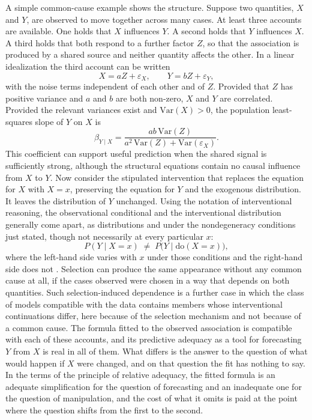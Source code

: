 \documentclass[11pt,letterpaper]{article}
\theoremstyle{definition}
\newcommand{\doop}{\mathrm{do}}
\begin{document}
A simple common-cause example shows the structure. Suppose two quantities, $X$ and $Y$, are observed to move together across many cases. At least three accounts are available. One holds that $X$ influences $Y$. A second holds that $Y$ influences $X$. A third holds that both respond to a further factor $Z$, so that the association is produced by a shared source and neither quantity affects the other. In a linear idealization the third account can be written
\begin{equation}
  X = aZ + \varepsilon_X,
  \qquad
  Y = bZ + \varepsilon_Y,
  \label{eq:common}
\end{equation}
with the noise terms independent of each other and of $Z$. Provided that $Z$ has positive variance and $a$ and $b$ are both non-zero, $X$ and $Y$ are correlated. Provided the relevant variances exist and $\mathrm{Var}(X)>0$, the population least-squares slope of $Y$ on $X$ is
\begin{equation}
  \beta_{Y\mid X}
  = \frac{ab\,\mathrm{Var}(Z)}{a^{2}\,\mathrm{Var}(Z) + \mathrm{Var}(\varepsilon_X)}.
  \label{eq:slope}
\end{equation}
This coefficient can support useful prediction when the shared signal is sufficiently strong, although the structural equations contain no causal influence from $X$ to $Y$. Now consider the stipulated intervention that replaces the equation for $X$ with $X = x$, preserving the equation for $Y$ and the exogenous distribution. It leaves the distribution of $Y$ unchanged. Using the notation of interventional reasoning, the observational conditional and the interventional distribution generally come apart, as distributions and under the nondegeneracy conditions just stated, though not necessarily at every particular $x$:
\begin{equation}
  P(Y \mid X = x) \;\neq\; P\bigl(Y \mid \doop(X = x)\bigr),
  \label{eq:do}
\end{equation}
where the left-hand side varies with $x$ under those conditions and the right-hand side does not \cite{pearl2009}. Selection can produce the same appearance without any common cause at all, if the cases observed were chosen in a way that depends on both quantities. Such selection-induced dependence is a further case in which the class of models compatible with the data contains members whose interventional continuations differ, here because of the selection mechanism and not because of a common cause. The formula fitted to the observed association is compatible with each of these accounts, and its predictive adequacy as a tool for forecasting $Y$ from $X$ is real in all of them. What differs is the answer to the question of what would happen if $X$ were changed, and on that question the fit has nothing to say. In the terms of the principle of relative adequacy, the fitted formula is an adequate simplification for the question of forecasting and an inadequate one for the question of manipulation, and the cost of what it omits is paid at the point where the question shifts from the first to the second.
\end{document}
